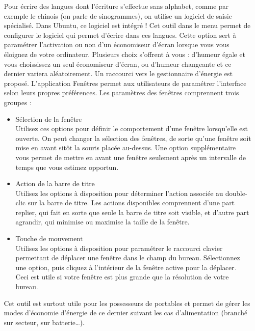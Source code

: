 Pour écrire des langues dont l'écriture s'effectue sans alphabet, comme par exemple le chinois (on parle de sinogrammes), on utilise un logiciel de saisie spécialisé. Dans Ubuntu, ce logiciel est intégré ! Cet outil dans le menu permet de configurer le logiciel qui permet d'écrire dans ces langues.
Cette option sert à paramétrer l'activation ou non d'un économiseur d'écran lorsque vous vous éloignez de votre ordinateur. Plusieurs choix s'offrent à vous : d'humeur égale et vous choississez un seul économiseur d’écran, ou d'humeur changeante et ce dernier variera aléatoirement. Un raccourci vers le gestionnaire d'énergie est proposé.
L'application Fenêtres permet aux utilisateurs de paramétrer l'interface selon leurs propres préférences. Les paramètres des fenêtres comprennent trois groupes : 
\begin{itemize}
\item Sélection de la fenêtre\\
Utilisez ces options pour définir le comportement d'une fenêtre lorsqu'elle est ouverte. On peut changer la sélection des fenêtres, de sorte qu'une fenêtre soit mise en avant sitôt la souris placée au-dessus. Une option supplémentaire vous permet de mettre en avant une fenêtre seulement après un intervalle de temps que vous estimez opportun. 
\item Action de la barre de titre\\
Utilisez les options à disposition pour déterminer l'action associée au double-clic sur la barre de titre. Les actions disponibles comprennent d'une part replier, qui fait en sorte que seule la barre de titre soit visible, et d'autre part agrandir, qui minimise ou maximise la taille de la fenêtre. 
\item Touche de mouvement\\
Utilisez les options à disposition pour paramétrer le raccourci clavier permettant de déplacer une fenêtre dans le champ du bureau. Sélectionnez une option, puis cliquez à l'intérieur de la fenêtre active pour la déplacer. Ceci est utile si votre fenêtre est plus grande que la résolution de votre bureau. 
\end{itemize}
Cet outil est surtout utile pour les possesseurs de portables et permet de gérer les modes d'économie d'énergie de ce dernier suivant les cas d'alimentation (branché sur secteur, sur batterie\ldots{}).
